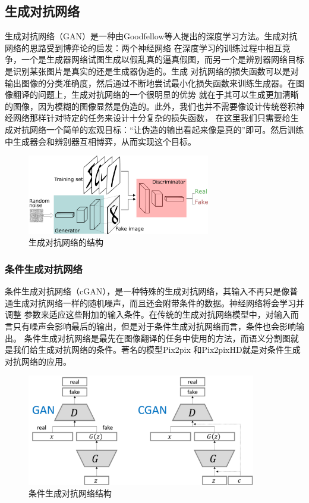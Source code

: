 \documentclass[supercite]{HustGraduPaper}
\theoremstyle{definition}
\begin{document}
\subsection{生成对抗网络}

生成对抗网络（GAN）是一种由Goodfellow等人提出的深度学习方法\cite{Goodfellow-et-al-2016}。生成对抗网络的思路受到博弈论的启发：两个神经网络
在深度学习的训练过程中相互竞争，一个是生成器网络试图生成以假乱真的逼真假图，而另一个是辨别器网络目标是识别某张图片是真实的还是生成器伪造的。生成
对抗网络的损失函数可以是对输出图像的分类准确度，然后通过不断地尝试最小化损失函数来训练生成器。在图像翻译的问题上，生成对抗网络的一个很明显的优势
就在于其可以生成更加清晰的图像，因为模糊的图像显然是伪造的。此外，我们也并不需要像设计传统卷积神经网络那样针对特定的任务来设计十分复杂的损失函数，
在这里我们只需要给生成对抗网络一个简单的宏观目标：“让伪造的输出看起来像是真的”即可。然后训练中生成器会和辨别器互相博弈，从而实现这个目标。
\begin{figure}[H]
  \begin{center}
  \includegraphics[width=8cm]{images/GANs}
  \end{center}
  \caption{生成对抗网络的结构}
  \label{fig:GANs-structure}
\end{figure}

\subsubsection{条件生成对抗网络}

条件生成对抗网络（cGAN），是一种特殊的生成对抗网络，其输入不再只是像普通生成对抗网络一样的随机噪声，而且还会附带条件的数据。神经网络将会学习并调整
参数来适应这些附加的输入条件。在传统的生成对抗网络模型中，对输入而言只有噪声会影响最后的输出，但是对于条件生成对抗网络而言，条件也会影响输出。
条件生成对抗网络是最先在图像翻译的任务中使用的方法，而语义分割图就是我们给生成对抗网络的条件。著名的模型Pix2pix\cite{pix2pix2016}
和Pix2pixHD\cite{wang2018pix2pixHD}就是对条件生成对抗网络的应用。

\begin{figure}[H]
  \begin{center}
  \includegraphics[width=10cm]{images/cGANs}
  \end{center}
  \caption{条件生成对抗网络结构}
  \label{fig:cGANs-structure}
\end{figure}
\end{document}
